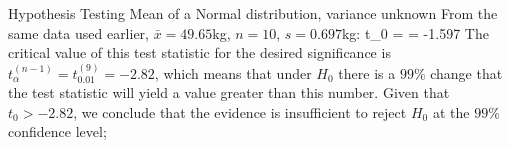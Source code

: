 \documentclass[t]{beamer}
\begin{document}

\begin{ftst}
{Hypothesis Testing}
{Mean of a Normal distribution, variance unknown}
From the same data used earlier, $\bar{x} = 49.65$kg, $n=10$, $s = 0.697$kg:
\beqs t_0 =  = -1.597\eqs
\vhalf
The critical value of this test statistic for the desired significance is $t_{\alpha}^{(n-1)} = t_{0.01}^{(9)} = -2.82$, which means that under $H_0$ there is a $99\%$ change that the test statistic will yield a value greater than this number.
\vone
Given that $t_0 > -2.82$, we conclude that the evidence is insufficient to reject $H_0$ at the $99\%$ confidence level;
\end{ftst}

\end{document}
